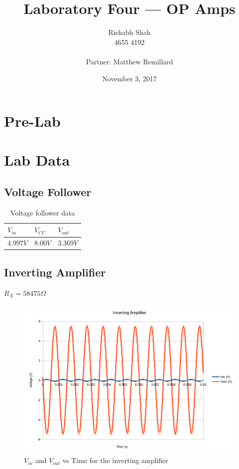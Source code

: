 \documentclass[10pt]{article}
\begin{document}
\title{Laboratory Four --- OP Amps}
\date{November 3, 2017}
\author{Rishabh Shah\\ 4655 4192\\ \\ Partner: Matthew Remillard}
\maketitle
\newpage

\section*{Pre-Lab}

\section*{Lab Data}
\subsection*{Voltage Follower}
\begin{table}[H]
	\centering
	\begin{tabular}{lll}
		\hline
		$V_{in}$ & $V_{CC}$ & $V_{out}$\\
		\hline
		$4.997V$ & $8.00V$ & $3.369V$\\
		\hline
	\end{tabular}
	\caption{Voltage follower data}
\end{table}

\subsection*{Inverting Amplifier}
$R_X = 58475 \Omega$
\begin{figure}[H]
	\centering
	\includegraphics[width=\textwidth]{InvertingAmp.png}
	\caption{$V_{in}$ and $V_{out}$ vs Time for the inverting amplifier}
\end{figure}
\end{document}
